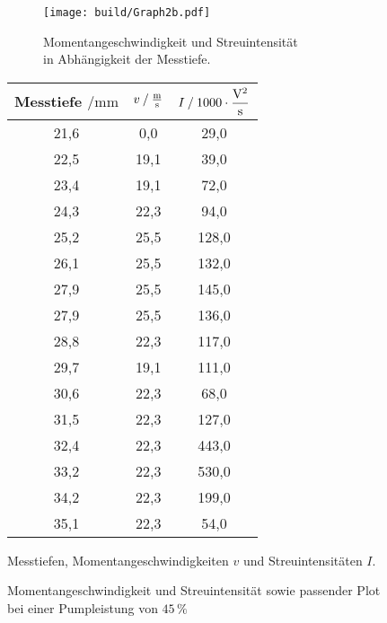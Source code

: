\begin{figure}[H]
    \begin{subfigure}{0.57\textwidth} 
        \centering
        \texttt{[image: build/Graph2b.pdf]} 
        \caption{Momentangeschwindigkeit und Streuintensität \\ in Abhängigkeit der Messtiefe.}
        \label{fig:graph2b}
        \qquad
    \end{subfigure}
    \begin{subtable}{0.43\textwidth}
        \centering
       \begin{tabular}{c c c}
        \toprule 
        {Messtiefe $\mathbin{/} \unit{\milli\meter}$} & {$v \mathbin{/} \unit{\frac{\meter}{\second}} $} & {$I \mathbin{/} 1000 \cdot \unit{\dfrac{\volt^2}{\second}}$}  \\
        \midrule 
            21,6     &     0,0      &     29,0    \\
            22,5     &    19,1     &     39,0    \\
            23,4     &    19,1     &     72,0    \\
            24,3     &    22,3     &     94,0    \\
            25,2     &    25,5     &    128,0   \\
            26,1     &    25,5     &    132,0   \\
            27,9     &    25,5     &    145,0   \\
            27,9     &    25,5     &    136,0   \\
            28,8     &    22,3     &    117,0   \\
            29,7     &    19,1     &    111,0   \\
            30,6     &    22,3     &     68,0    \\
            31,5     &    22,3     &    127,0   \\
            32,4     &    22,3     &    443,0   \\
            33,2     &    22,3     &    530,0   \\
            34,2     &    22,3     &    199,0   \\
            35,1     &    22,3     &     54,0    \\
        \bottomrule
    \end{tabular} 
    \caption{Messtiefen, Momentangeschwindigkeiten $v$ und Streuintensitäten $I$.}
     \label{tab:2b}  
 \end{subtable}
 \caption{Momentangeschwindigkeit und Streuintensität sowie passender Plot bei einer Pumpleistung von $45 \,\%$} 
\end{figure}     



